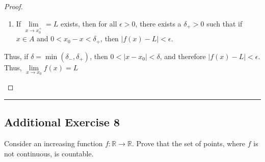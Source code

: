 \documentclass[openany, amssymb, psamsfonts]{amsart}
\theoremstyle{definition}
\numberwithin{equation}{section}
\begin{document}
\begin{enumerate}
\begin{proof}
\begin{itemize}
\begin{enumerate}
            \item If $\lim\limits_{x\to x_0^+} = L$ exists, then for all $\epsilon>0$, there exists a $\delta_+>0$ such that if $x\in A$ and $0<x_0-x<\delta_+$, then $|f(x) - L| < \epsilon$.
        \end{enumerate} 
        Thus, if $\delta = \min(\delta_-,\delta_+)$, then $0<|x-x_0|<\delta$, and therefore $|f(x) - L| < \epsilon$. Thus, $\lim\limits_{x\to x_0}f(x) = L$
    \end{itemize}
\end{proof}\vspace{4pt}     \hrule   \vspace{4pt}
\end{enumerate}

\subsection*{Additional Exercise 8}
Consider an increasing function $f\colon \mathbb{R} \longrightarrow \mathbb{R}.$ Prove that the set of points, where $f$ is not continuous, is countable.
\end{document}
